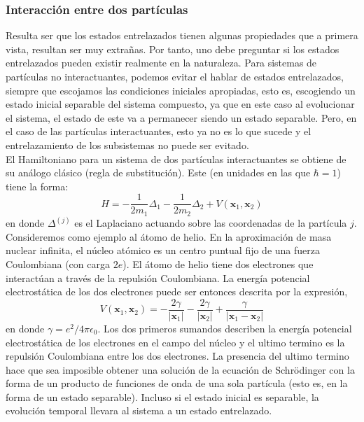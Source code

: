 \documentclass[12pt]{book}
\numberwithin{equation}{chapter}
\def\x{\mathbf{x}}
\begin{document}
\subsubsection{Interacci\'on entre dos part\'iculas}
Resulta ser que los estados entrelazados tienen algunas propiedades que a primera vista, resultan ser muy extra\~nas. Por tanto, uno debe preguntar si los estados entrelazados pueden existir realmente en la naturaleza. Para sistemas de part\'iculas no interactuantes, podemos evitar el hablar de estados entrelazados, siempre que escojamos las condiciones iniciales apropiadas, esto es, escogiendo un estado inicial separable del sistema compuesto, ya que en este caso al evolucionar el sistema, el estado de este va a permanecer siendo un estado separable. Pero, en el caso de las part\'iculas interactuantes, esto ya no es lo que sucede y el entrelazamiento de los subsistemas no puede ser evitado. \\
El Hamiltoniano para un sistema de dos part\'iculas interactuantes se obtiene de su an\'alogo cl\'asico (regla de substituci\'on). Este (en unidades en las que $\hbar=1$) tiene la forma:
\begin{equation}\label{Ham-2p-1}
H= - \frac{1}{2m_{1}} \Delta_{1} - \frac{1}{2m_{2}} \Delta_{2} + V(\x_{1} , \x_{2})
\end{equation}
en donde $\Delta^{(j)}$ es el Laplaciano actuando sobre las coordenadas de la part\'icula $j$. Consideremos como ejemplo al \'atomo de helio. En la aproximaci\'on de masa nuclear infinita, el n\'ucleo at\'omico es un centro puntual fijo de una fuerza Coulombiana (con carga $2e$). El \'atomo de helio tiene dos electrones que interact\'uan a trav\'es de la repulsi\'on Coulombiana. La energ\'ia potencial electrost\'atica de los dos electrones puede ser entonces descrita por la expresi\'on,
\begin{equation}
V(\x_{1},\x_{2})= - \frac{2 \gamma}{|\x_{1}|} - \frac{2 \gamma}{|\x_{2}|} + \frac{\gamma}{ |\x_{1} - \x_{2} |} 
\end{equation}
en donde $\gamma = e^{2}/4 \pi \epsilon_{0}$. Los dos primeros sumandos describen la energ\'ia potencial electrost\'atica de los electrones en el campo del n\'ucleo y el ultimo termino es la repulsi\'on Coulombiana entre los dos electrones. La presencia del ultimo termino hace que sea imposible obtener una soluci\'on de la ecuaci\'on de Schr\"odinger con la forma de un producto de funciones de onda de una sola part\'icula (esto es, en la forma de un estado separable). Incluso si el estado inicial es separable, la evoluci\'on temporal llevara al sistema a un estado entrelazado.  
\end{document}
